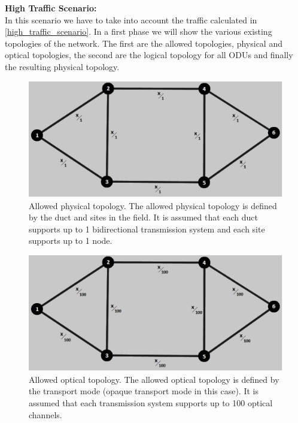 \noindent
\textbf{High Traffic Scenario:}\\

In this scenario we have to take into account the traffic calculated in \ref{high_traffic_scenario}. In a first phase we will show the various existing topologies of the network. The first are the allowed topologies, physical and optical topologies, the second are the logical topology for all ODUs and finally the resulting physical topology.\\

\begin{figure}[H]
\centering
\includegraphics[width=13cm]{sdf/heuristic/opaque_protection/figures/allowed_physical}
\caption{Allowed physical topology. The allowed physical topology is defined by the duct and sites in the field. It is assumed that each duct supports up to 1 bidirectional transmission system and each site supports up to 1 node.}
\label{allowed_physical_protec_ref_high_heuristic}
\end{figure}

\begin{figure}[H]
\centering
\includegraphics[width=13cm]{sdf/heuristic/opaque_protection/figures/allowed_optical}
\caption{Allowed optical topology. The allowed optical topology is defined by the transport mode (opaque transport mode in this case). It is assumed that each transmission system supports up to 100 optical channels.}
\label{allowed_optical_protec_ref_high_heuristic}
\end{figure}

